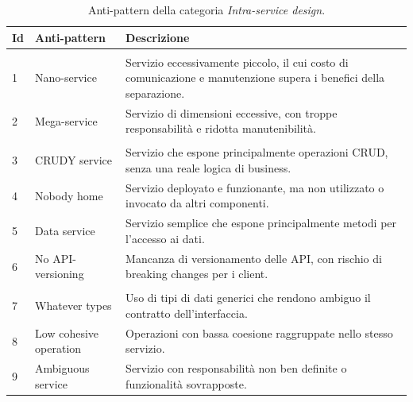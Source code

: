 \begin{table}[H]
\centering
\caption{Anti-pattern della categoria \textit{Intra-service design}.}
\label{tab:intra_service_design}
\small
\renewcommand{\arraystretch}{1.15}
\setlength{\tabcolsep}{7pt}

\begin{tabularx}{\textwidth}{
>{\centering\arraybackslash}p{0.8cm}
>{\RaggedRight\arraybackslash}p{3.8cm}
>{\RaggedRight\arraybackslash}X
}
\toprule
\textbf{Id} & \textbf{Anti-pattern} & \textbf{Descrizione} \\
\midrule

\multicolumn{3}{l}{\textit{Granularity}} \\
\cmidrule(lr){1-3}

1 & Nano-service
& Servizio eccessivamente piccolo, il cui costo di comunicazione e manutenzione supera i benefici della separazione. \\

\addlinespace[0.3em]

2 & Mega-service
& Servizio di dimensioni eccessive, con troppe responsabilità e ridotta manutenibilità. \\

\addlinespace[0.6em]

\multicolumn{3}{l}{\textit{Service interface}} \\
\cmidrule(lr){1-3}

3 & CRUDY service
& Servizio che espone principalmente operazioni CRUD, senza una reale logica di business. \\

\addlinespace[0.3em]

4 & Nobody home
& Servizio deployato e funzionante, ma non utilizzato o invocato da altri componenti. \\

\addlinespace[0.3em]

5 & Data service
& Servizio semplice che espone principalmente metodi per l’accesso ai dati. \\

\addlinespace[0.3em]

6 & No API-versioning
& Mancanza di versionamento delle API, con rischio di breaking changes per i client. \\

\addlinespace[0.6em]

\multicolumn{3}{l}{\textit{Functional cohesion}} \\
\cmidrule(lr){1-3}

7 & Whatever types
& Uso di tipi di dati generici che rendono ambiguo il contratto dell’interfaccia. \\

\addlinespace[0.3em]

8 & Low cohesive operation
& Operazioni con bassa coesione raggruppate nello stesso servizio. \\

\addlinespace[0.3em]

9 & Ambiguous service
& Servizio con responsabilità non ben definite o funzionalità sovrapposte. \\

\bottomrule
\end{tabularx}
\end{table}
